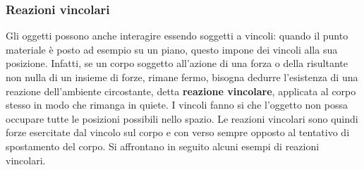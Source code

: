 \documentclass[10pt,a4paper]{book}
\begin{document}
\subsubsection{Reazioni vincolari}

Gli oggetti possono anche interagire essendo soggetti a vincoli: quando il punto materiale è posto ad esempio su un piano, questo impone dei vincoli alla sua posizione. Infatti, se un corpo soggetto all'azione di una forza o della risultante non nulla di un insieme di forze, rimane fermo, bisogna dedurre l'esistenza di una reazione dell'ambiente circostante, detta \textbf{reazione vincolare}, applicata al corpo stesso in modo che rimanga in quiete. I vincoli fanno si che l'oggetto non possa occupare tutte le posizioni possibili nello spazio. Le reazioni vincolari sono quindi forze esercitate dal vincolo sul corpo e con verso sempre opposto al tentativo di spostamento del corpo. Si affrontano in seguito alcuni esempi di reazioni vincolari.
\end{document}
